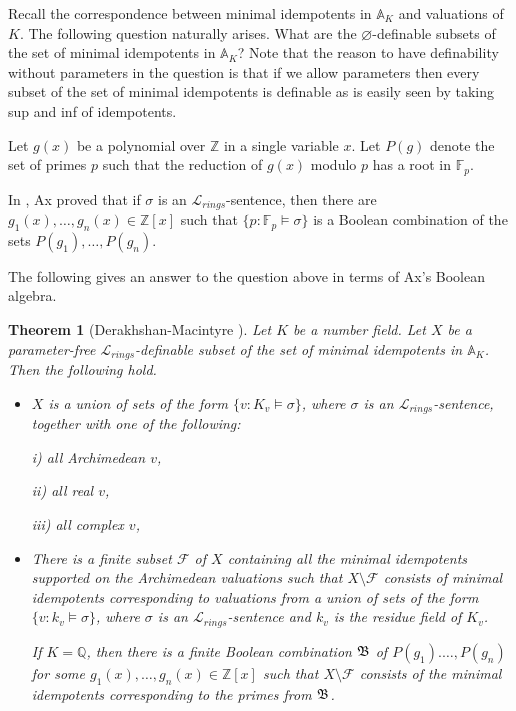 \documentclass[12pt]{amsart}
\def\A{\mathbb{A}}
\def\F{\mathbb{F}}
\def\emptyset{\varnothing}
\def\Z{\mathbb{Z}}
\def\cL{\mathcal{L}}
\def\Q{\mathbb{Q}}
\def\F{\mathbb{F}}
\def\cL{\mathcal{L}}
\newtheorem{thm}{Theorem}[section]
\numberwithin{equation}{section}
\begin{document}
\medskip

Recall the correspondence between minimal idempotents in $\A_K$ and valuations of $K$. 
The following question naturally arises.  What are the $\emptyset$-definable subsets 
of the set of minimal idempotents in $\A_K$? Note that the reason to have definability without parameters in the question 
is that if we allow parameters then every subset of the set of minimal idempotents is definable as is easily seen by taking sup and inf of idempotents. 

Let $g(x)$ be a polynomial over $\Z$ in a single variable $x$. Let $P(g)$ denote the set of primes $p$ such that the reduction of $g(x)$ modulo $p$ has a root in $\F_p$. 

In \cite{ax}, Ax proved that if $\sigma$ is an 
$\cL_{rings}$-sentence, then there are $g_1(x),\dots,g_n(x)\in \Z[x]$ such that $\{p: \F_p \models \sigma\}$ is a Boolean combination of the sets $P(g_1), \dots, P(g_n)$. 

The following gives an answer to the question above in terms of Ax's Boolean algebra.
\begin{thm}[Derakhshan-Macintyre {\cite{DM-ad}}]\label{th-def-pr} Let $K$ be a number field. 
Let $X$ be a parameter-free $\mathcal{L}_{rings}$-definable subset of the set of minimal idempotents in $\A_{K}$. Then the following hold.
\begin{itemize}
\item $X$ is a union of 
sets of the form $\{v: K_v \models \sigma\}$, where $\sigma$ is an $\cL_{rings}$-sentence, together with one of the following:

i) all Archimedean $v$,

ii) all real $v$,

iii) all complex $v$,

\item There is a finite subset $\mathcal{F}$ of $X$ containing all the minimal idempotents supported on the Archimedean valuations such that $X\setminus \mathcal{F}$ consists of minimal idempotents corresponding to 
valuations from a union of sets of the form $\{v: k_v\models \sigma\}$, where $\sigma$ is an $\cL_{rings}$-sentence and $k_v$ is the residue field of $K_v$. 

If $K=\Q$, then there is a finite Boolean combination $\frak B$ of $P(g_1).\dots,P(g_n)$ for some  $g_1(x),\dots,g_n(x)\in \Z[x]$ such that $X\setminus \mathcal{F}$ consists of the minimal idempotents corresponding to the primes from $\frak{B}$. 
\end{itemize}
\end{thm}
\end{document}
